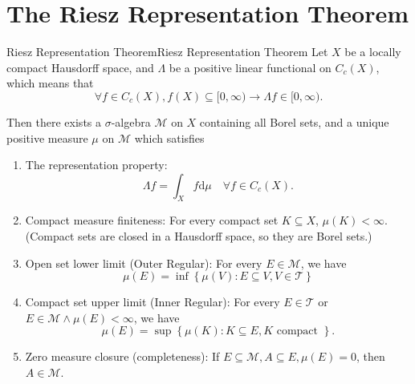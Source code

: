 \documentclass[../main.tex]{subfiles}
\begin{document}
\section{The Riesz Representation Theorem}
\begin{theorem}{Riesz Representation Theorem}{Riesz Representation Theorem}
	Let $X$ be a locally compact Hausdorff space, and $\Lambda$ be a positive linear functional on $C_c(X)$, which means that
	\begin{equation*}
		\forall f\in C_c(X), f(X) \subseteq [0,\infty ) \rightarrow \Lambda f\in [0,\infty ).
	\end{equation*}

	Then there exists a $\sigma$-algebra $\mathcal{M}$ on $X$ containing all Borel sets, and a unique positive measure $\mu$ on $\mathcal{M}$ which satisfies
	\begin{enumerate}
		\item The representation property:
		\begin{equation*}
			\Lambda f = \int_X f \mathrm{d} \mu \quad \forall f\in C_c(X).
		\end{equation*}
	\item Compact measure finiteness: For every compact set $K\subseteq X$, $\mu(K) < \infty$. (Compact sets are closed in a Hausdorff space, so they are Borel sets.)
	\item Open set lower limit (Outer Regular): For every $E\in \mathcal{M}$, we have
		\begin{equation*}
			\mu(E) = \inf \left\{ \mu(V): E \subseteq V, V\in \mathcal{T} \right\}
		\end{equation*}
	\item Compact set upper limit (Inner Regular): For every $E\in \mathcal{T}$ or $E\in \mathcal{M}\land \mu(E)<\infty $, we have
		\begin{equation*}
			\mu(E) = \sup \left\{ \mu(K): K \subseteq E, K \text{ compact } \right\}.
		\end{equation*}
	\item Zero measure closure (completeness): If $E \subseteq \mathcal{M}, A \subseteq E, \mu(E)=0$, then $A\in \mathcal{M}$.
	\end{enumerate}
\end{theorem}
\end{document}
